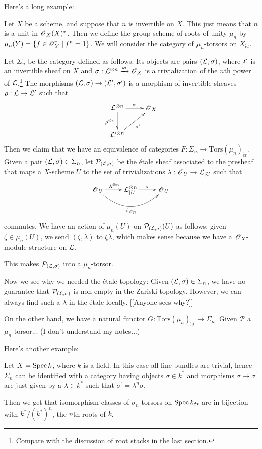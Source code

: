 \documentclass[11pt, english]{article}
\begin{document}
Here's a long example:
\begin{example}
Let $X$ be a scheme, and suppose that $n$ is invertible on $X$. This just means that $n$ is a unit in $\operatorname{\mathscr{O}}_X(X)^\ast$. Then we define the group scheme of roots of unity $\mu_n$ by $\mu_n(Y) = \{ f \in \operatorname{\mathscr{O}}_Y^\ast \, | \, f^n = 1\}$. We will consider the category of $\mu_n$-torsors on $X_{\acute et}$.

Let $\Sigma_n$ be the category defined as follows: Its objects are pairs $(\mathcal{L}, \sigma)$, where $\mathcal{L}$ is an invertible sheaf on $X$ and $\sigma: \mathcal{L}^{\otimes n } \xrightarrow{\approx} \operatorname{\mathscr{O}}_X$ is a trivialization of the $n$th power of $\mathcal{L}$.\footnote{Compare with the discussion of root stacks in the last section.} The morphisms $(\mathcal{L},\sigma) \to (\mathcal{L}^\prime, \sigma^\prime)$ is a morphism of invertible sheaves $\rho:\mathcal{L} \to \mathcal{L}^\prime$ such that 
\[
\xymatrix{
\LL^{\otimes n} \ar[r]^\sigma \ar[d]_{\rho^{\otimes n}} & \OO_X \\
\LL^{\prime \otimes n} \ar[ur]_{\sigma^\prime}
} 
\]
Then we claim that we have an equivalence of categories $F:\Sigma_n \to \mathrm{Tors}(\mu_n)_{\acute e t}$. Given a pair $(\mathcal{L},\sigma) \in \Sigma_n$, let $\mathcal P_{(\mathcal{L},\sigma)}$ be the étale sheaf associated to the presheaf that maps a $X$-scheme $U$ to the set of trivializations $\lambda:\operatorname{\mathscr{O}}_U \to \mathcal{L}_{|U}$ such that 
\[
\xymatrix{
\OO_U \ar[r]^{\lambda^{\otimes n}} \ar@/_2pc/[rr]_{\id_{\OO_U}} & \LL_{|U}^{\otimes n} \ar[r]^\sigma & \OO_U
}
\]
commutes. We have an action of $\mu_n(U)$ on $\mathcal P_{(\mathcal{L},\sigma)}(U)$ as follows: given $\zeta \in \mu_n(U)$, we send $(\zeta,\lambda)$ to $\zeta \lambda$, which makes sense because we have a $\operatorname{\mathscr{O}}_X$-module structure on $\mathcal{L}$.

This makes $\mathcal P_{(\mathcal{L},\sigma)}$ into a $\mu_n$-torsor.

Now we see why we needed the étale topology: Given $(\mathcal{L},\sigma) \in \Sigma_n$, we have no guarantee that $\mathcal P_{(\mathcal{L},\sigma)}$ is non-empty in the Zariski-topology. However, we can always find such a $\lambda$ in the étale locally. [[Anyone sees why?]]

On the other hand, we have a natural functor $G:\mathrm{Tors}(\mu_n)_{\acute et}\to \Sigma_n$. Given $\mathcal P$ a $\mu_n$-torsor... (I don't understand my notes...)
\end{example}

Here's another example:
\begin{example}
Let $X = \operatorname{Spec} k$, where $k$ is a field. In this case all line bundles are trivial, hence $\Sigma_n$ can be identified with a category having objects $\sigma \in k^\ast$ and morphisms $\sigma \to \sigma^\prime$ are just given by a $\lambda \in k^\ast$ such that $\sigma^\prime = \lambda^n \sigma$. 

Then we get that isomorphism classes of $\sigma_n$-torsors on $\operatorname{Spec} k_{\acute et}$ are in bijection with $k^\ast / (k^\ast)^n$, the $n$th roots of $k$.
\end{example}
\end{document}
